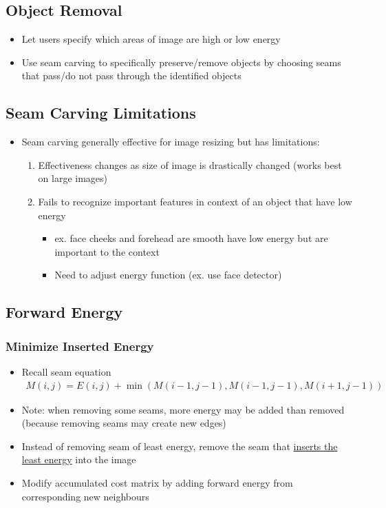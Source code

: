 \documentclass[letterpaper,12pt]{article}
\begin{document}
\subsection{Object Removal}
\begin{itemize}
 \item Let users specify which areas of image are high or low energy
 \item Use seam carving to specifically preserve/remove objects by choosing seams that pass/do not pass through the identified objects
\end{itemize}

\subsection{Seam Carving Limitations}
\begin{itemize}
 \item Seam carving generally effective for image resizing but has limitations:
       \begin{enumerate}
        \item Effectiveness changes as size of image is drastically changed (works best on large images)
        \item Fails to recognize important features in context of an object that have low energy
              \begin{itemize}
               \item ex. face cheeks and forehead are smooth have low energy but are important to the context
               \item Need to adjust energy function (ex. use face detector)
              \end{itemize}
       \end{enumerate}
\end{itemize}

\subsection{Forward Energy}

\subsubsection{Minimize Inserted Energy}
\begin{itemize}
 \item Recall seam equation
       \begin{align}
        M(i,j) = E(i,j) + \min(M(i-1, j-1), M(i-1, j-1), M(i+1, j-1))
       \end{align}
 \item Note: when removing some seams, more energy may be added than removed (because removing seams may create new edges)
 \item Instead of removing seam of least energy, remove the seam that \underline{inserts the least energy} into the image
 \item Modify accumulated cost matrix by adding forward energy from corresponding new neighbours
\end{itemize}
\end{document}
